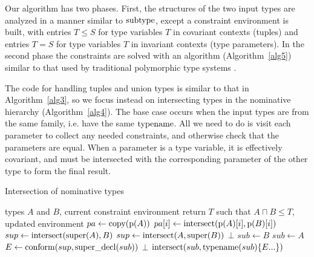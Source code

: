 Our algorithm has two phases. First, the structures of the two input types
are analyzed in a manner similar to $\operatorname{subtype}$, except a constraint
environment is built, with entries $T\leq S$ for type variables $T$ in
covariant contexts (tuples) and entries $T=S$ for type variables $T$ in
invariant contexts (type parameters). In the second phase the constraints
are solved with an algorithm (Algorithm~\ref{alg5}) similar to that
used by traditional polymorphic type systems \cite{MLtypeinf}.

The code for handling tuples and union types is similar to that in
Algorithm~\ref{alg3}, so we focus instead on intersecting types in the
nominative hierarchy (Algorithm~\ref{alg4}). The base case occurs when
the input types are from the same family, i.e. have the same
$\operatorname{typename}$. All we need to do is visit each parameter to collect any
needed constraints, and otherwise check that the parameters are equal.
When a parameter is a type variable, it is effectively covariant, and
must be intersected with the corresponding parameter of the other type
to form the final result.

\begin{algorithm}
\caption{Intersection of nominative types}
\label{alg4}
\begin{algorithmic}
\REQUIRE types $A$ and $B$, current constraint environment
\ENSURE return $T$ such that $A \sqcap B \leq T$, updated environment
 \STATE $pa \leftarrow \operatorname{copy}(\operatorname{p}(A))$
  \ENDIF
  \STATE $pa[i] \leftarrow \operatorname{intersect}(\operatorname{p}(A)[i],\operatorname{p}(B)[i])$
 \ENDFOR
\ELSE
 \STATE $sup \leftarrow \operatorname{intersect}(\operatorname{super}(A),B)$
  \STATE $sup \leftarrow \operatorname{intersect}(A,\operatorname{super}(B))$
   \RETURN $\bot$
  \ELSE
   \STATE $sub \leftarrow B$
  \ENDIF
 \ELSE
  \STATE $sub \leftarrow A$
 \ENDIF
 \STATE $E \leftarrow \operatorname{conform}(sup, \operatorname{super\_decl}(sub))$
  \RETURN $\bot$
 \ENDIF
 \RETURN $\operatorname{intersect}(sub, \operatorname{typename}(sub)\{E...\})$
\ENDIF
\end{algorithmic}
\end{algorithm}

